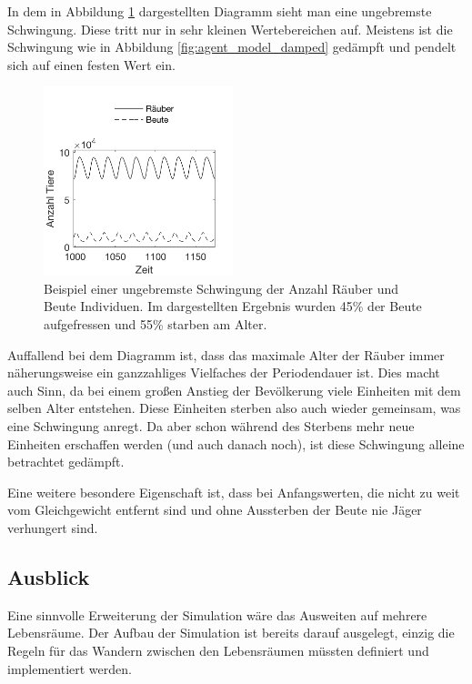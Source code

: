 \documentclass[a4paper,twoside]{article}
\begin{document}
	In dem in Abbildung \ref{fig:agent_model_oscillation} dargestellten Diagramm sieht man eine ungebremste Schwingung. Diese tritt nur in sehr kleinen Wertebereichen auf. Meistens ist die Schwingung wie in Abbildung \ref{fig:agent_model_damped} gedämpft und pendelt sich auf einen festen Wert ein.
	
	\begin{figure}[!h]
  		\centering
 		\includegraphics[width=5.5cm]{Diagramme/agent_model_oscillation.png}
  		\caption{Beispiel einer ungebremste Schwingung der Anzahl Räuber und Beute Individuen. Im dargestellten Ergebnis wurden 45\% der Beute aufgefressen und 55\% starben am Alter.}
  		\label{fig:agent_model_oscillation}
	\end{figure}
	
	Auffallend bei dem Diagramm ist, dass das maximale Alter der Räuber immer näherungsweise ein ganzzahliges Vielfaches der Periodendauer ist. Dies macht auch Sinn, da bei einem großen Anstieg der Bevölkerung viele Einheiten mit dem selben Alter entstehen. Diese Einheiten sterben also auch wieder gemeinsam, was eine Schwingung anregt. Da aber schon während des Sterbens mehr neue Einheiten erschaffen werden (und auch danach noch), ist diese Schwingung alleine betrachtet gedämpft.
	
	Eine weitere besondere Eigenschaft ist, dass bei Anfangswerten, die nicht zu weit vom Gleichgewicht entfernt sind und ohne Aussterben der Beute nie Jäger verhungert sind. 
	
	\subsection{Ausblick}
	Eine sinnvolle Erweiterung der Simulation wäre das Ausweiten auf mehrere Lebensräume. Der Aufbau der Simulation ist bereits darauf ausgelegt, einzig die Regeln für das Wandern zwischen den Lebensräumen müssten definiert und implementiert werden.
	
	\newpage	
	
\end{document}
